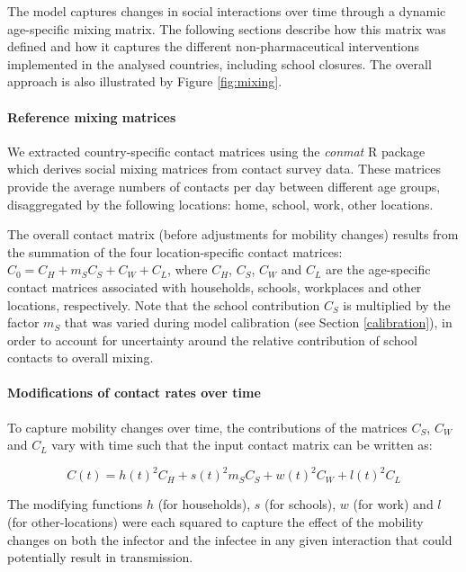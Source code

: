 The model captures changes in social interactions over time through a dynamic age-specific mixing matrix. The following
sections describe how this matrix was defined and how it captures the different non-pharmaceutical interventions implemented
in the analysed countries, including school closures. The overall approach is also illustrated by Figure \ref{fig:mixing}.

\paragraph{Reference mixing matrices}
We extracted country-specific contact matrices using the \textit{conmat} R package which derives social mixing matrices from 
contact survey data. These matrices provide the average numbers of contacts per day between different age groups, disaggregated by the following 
locations: home, school, work, other locations. 

The overall contact matrix (before adjustments for mobility changes) results from the summation of the four location-specific 
contact matrices: \(C_{0} = C_{H} + m_S C_{S} + C_{W} + C_{L}\), where \(C_{H}\), \(C_{S}\), \(C_{W}\) and \(C_{L}\) are the age-specific
contact matrices associated with households, schools, workplaces and other locations, respectively. Note that the school contribution $C_{S}$ is 
multiplied by the factor $m_S$ that was varied during model calibration (see Section \ref{calibration}), in order to account for uncertainty around 
the relative contribution of school contacts to overall mixing.

\paragraph{Modifications of contact rates over time}
\label{time_var_mixing}
To capture mobility changes over time, the contributions of the matrices \(C_{S}\), \(C_{W}\) and \(C_{L}\) vary with time such that the input contact matrix can be written as:

\begin{equation}
\label{eq_mixing}
  C(t)= h(t)^{2}C_{H}+ s(t)^{2} m_S C_{S}+ w(t)^{2}C_{W}+l(t)^{2}C_{L}
\end{equation}

The modifying functions $h$ (for households), $s$ (for schools), $w$ (for work) and $l$ (for other-locations) were each squared to capture the effect of the mobility changes on 
both the infector and the infectee in any given interaction that could potentially result in transmission. 

